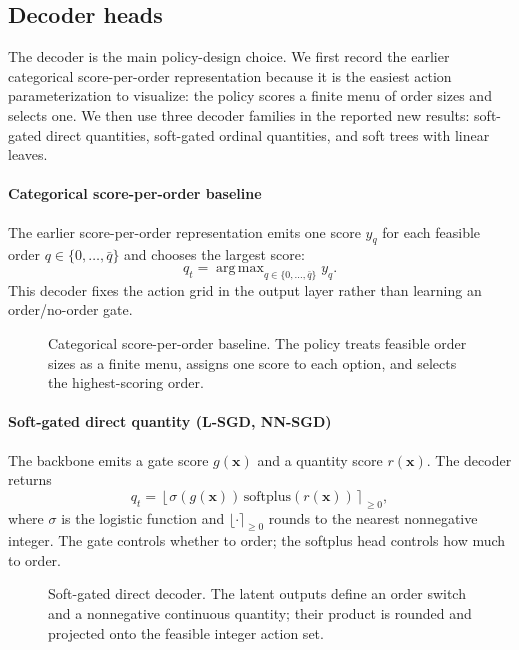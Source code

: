 \documentclass[authoryear,11pt]{elsarticle}
\DeclareMathOperator*{\argmax}{arg\,max}
\begin{document}
\subsection{Decoder heads}

The decoder is the main policy-design choice. We first record the earlier categorical score-per-order representation because it is the easiest action parameterization to visualize: the policy scores a finite menu of order sizes and selects one. We then use three decoder families in the reported new results: soft-gated direct quantities, soft-gated ordinal quantities, and soft trees with linear leaves.

\paragraph{Categorical score-per-order baseline}
The earlier score-per-order representation emits one score $y_q$ for each feasible order $q\in\{0,\ldots,\bar q\}$ and chooses the largest score:
\[
q_t=\argmax_{q\in\{0,\ldots,\bar q\}} y_q.
\]
This decoder fixes the action grid in the output layer rather than learning an order/no-order gate.

\begin{figure}[H]
\centering
\CategoricalDecoderFigure
\caption{Categorical score-per-order baseline. The policy treats feasible order sizes as a finite menu, assigns one score to each option, and selects the highest-scoring order.}
\label{fig:decoder-categorical}
\end{figure}

\paragraph{Soft-gated direct quantity (L-SGD, NN-SGD)}
The backbone emits a gate score $g(\mathbf x)$ and a quantity score $r(\mathbf x)$. The decoder returns
\[
q_t=\left\lfloor \sigma(g(\mathbf x))\,\mathrm{softplus}(r(\mathbf x)) \right\rceil_{\ge0},
\]
where $\sigma$ is the logistic function and $\lfloor\cdot\rceil_{\ge0}$ rounds to the nearest nonnegative integer. The gate controls whether to order; the softplus head controls how much to order.

\begin{figure}[H]
\centering
\SoftGatedDirectDecoderFigure
\caption{Soft-gated direct decoder. The latent outputs define an order switch and a nonnegative continuous quantity; their product is rounded and projected onto the feasible integer action set.}
\label{fig:decoder-direct}
\end{figure}
\end{document}
